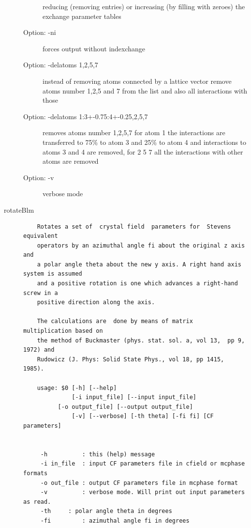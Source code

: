 \begin{description}
\begin{description}
                         reducing (removing entries) or increasing (by filling with zeroes) 
                         the exchange parameter tables
\item[Option:  -ni ] forces output without indexchange 
\item[Option: -delatoms 1,2,5,7 ]  instead of removing atoms connected by a lattice vector 
 			remove atoms number 1,2,5 and 7 from the list and also all interactions with those 
\item[Option: -delatoms 1:3+-0.75:4+-0.25,2,5,7]  removes atoms number 1,2,5,7 for atom 1 the interactions
 			 are transferred to 75\% to atom 3 and 25\% to atom 4 and interactions to atoms 3 and 4 are
 			 removed, for 2 5 7 all the interactions with other atoms are removed
\item[Option: -v ] verbose mode
\end{description}
\item [\prg rotateBlm\index{rotateBlm}]
  \begin{verbatim}
    Rotates a set of  crystal field  parameters for  Stevens equivalent
    operators by an azimuthal angle fi about the original z axis and
    a polar angle theta about the new y axis. A right hand axis system is assumed
    and a positive rotation is one which advances a right-hand screw in a
    positive direction along the axis.

    The calculations are  done by means of matrix  multiplication based on
    the method of Buckmaster (phys. stat. sol. a, vol 13,  pp 9, 1972) and
    Rudowicz (J. Phys: Solid State Phys., vol 18, pp 1415, 1985).   

    usage: $0 [-h] [--help] 
              [-i input_file] [--input input_file]
	      [-o output_file] [--output output_file]
              [-v] [--verbose] [-th theta] [-fi fi] [CF parameters]

          
     -h          : this (help) message
     -i in_file  : input CF parameters file in cfield or mcphase formats
     -o out_file : output CF parameters file in mcphase format
     -v          : verbose mode. Will print out input parameters as read.
     -th	 : polar angle theta in degrees
     -fi         : azimuthal angle fi in degrees


\end{verbatim}
\end{description}
